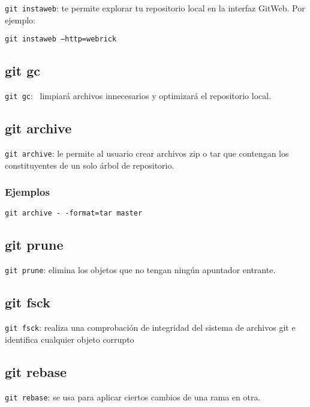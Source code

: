 \documentclass[
  a2paper,
]{article}
\begin{document}
\texttt{git\ instaweb}: te permite explorar tu repositorio local en la
interfaz GitWeb. Por ejemplo:

\texttt{git\ instaweb\ –http=webrick}

\hypertarget{git-gc}{%
\subsection{git gc}\label{git-gc}}

\texttt{git\ gc}: ~limpiará archivos innecesarios y optimizará el
repositorio local.

\hypertarget{git-archive}{%
\subsection{git archive}\label{git-archive}}

\texttt{git\ archive}: le permite al usuario crear archivos zip o tar
que contengan los constituyentes de un solo árbol de repositorio.

\hypertarget{ejemplos-8}{%
\subsubsection{Ejemplos}\label{ejemplos-8}}

\texttt{git\ archive\ -\ -format=tar\ master}

\hypertarget{git-prune}{%
\subsection{git prune}\label{git-prune}}

\texttt{git\ prune}: elimina los objetos que no tengan ningún apuntador
entrante.

\hypertarget{git-fsck}{%
\subsection{git fsck}\label{git-fsck}}

\texttt{git\ fsck}: realiza una comprobación de integridad del sistema
de archivos git e identifica cualquier objeto corrupto

\hypertarget{git-rebase}{%
\subsection{git rebase}\label{git-rebase}}

\texttt{git\ rebase}: se usa para aplicar ciertos cambios de una rama en
otra.
\end{document}
